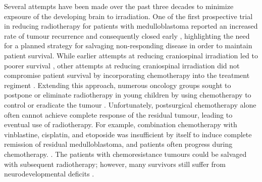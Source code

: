 Several attempts have been made over the past three decades to minimize expsoure of the developing brain to irradiation. One of the first prospective trial in reducing radiotherapy for patients with medulloblastoma reported an increased rate of tumour recurrence and consequently closed early , highlighting the need for a planned strategy for salvaging non-responding disease in order to maintain patient survival. While earlier attempts at reducing craniospinal irradiation led to poorer survival , other attempts at reducing craniospinal irradiation did not compromise patient survival by incorporating chemotherapy into the treatment regiment . Extending this approach, numerous oncology groups sought to postpone or eliminate radiotherapy in young children by using chemotherapy to control or eradicate the tumour . Unfortunately, postsurgical chemotherapy alone often cannot achieve complete response of the residual tumour, leading to eventual use of radiotherapy. For example, combination chemotherapy with vinblastine, cisplatin, and etoposide was insufficient by itself to induce complete remission of residual medulloblastoma, and patients often progress during chemotherapy. . The patients with chemoresistance tumours could be salvaged with subsequent radiotherapy; however, many survivors still suffer from neurodevelopmental deficits .

